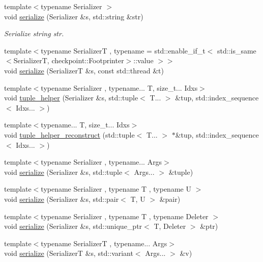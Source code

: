 \begin{DoxyCompactItemize}
{\footnotesize template$<$typename Serializer $>$ }\\void \hyperlink{namespacecheckpoint_aef8e8717e4cc129379525653730c4eba}{serialize} (Serializer \&s, std\+::string \&str)
\begin{DoxyCompactList}\small\item\em Serialize string {\ttfamily str}. \end{DoxyCompactList}\item 
{\footnotesize template$<$typename SerializerT , typename  = std\+::enable\+\_\+if\+\_\+t$<$    std\+::is\+\_\+same$<$\+Serializer\+T, checkpoint\+::\+Footprinter$>$\+::value  $>$$>$ }\\void \hyperlink{namespacecheckpoint_ab9c05efe18a47d990fb20e84f73e9943}{serialize} (SerializerT \&s, const std\+::thread \&t)
\item 
{\footnotesize template$<$typename Serializer , typename... T, size\+\_\+t... Idxs$>$ }\\void \hyperlink{namespacecheckpoint_ab763d3ca9396ff9a1896f5da6c2b3c54}{tuple\+\_\+helper} (Serializer \&s, std\+::tuple$<$ T... $>$ \&tup, std\+::index\+\_\+sequence$<$ Idxs... $>$)
\item 
{\footnotesize template$<$typename... T, size\+\_\+t... Idxs$>$ }\\void \hyperlink{namespacecheckpoint_a8370a2284f01f2fada353a096ab95f4d}{tuple\+\_\+helper\+\_\+reconstruct} (std\+::tuple$<$ T... $>$ $\ast$\&tup, std\+::index\+\_\+sequence$<$ Idxs... $>$)
\item 
{\footnotesize template$<$typename Serializer , typename... Args$>$ }\\void \hyperlink{namespacecheckpoint_a7ac21fa6ad08fd64a47c789c32966019}{serialize} (Serializer \&s, std\+::tuple$<$ Args... $>$ \&tuple)
\item 
{\footnotesize template$<$typename Serializer , typename T , typename U $>$ }\\void \hyperlink{namespacecheckpoint_a7b5c3ff67d3f7b65cfb46da7617e87ad}{serialize} (Serializer \&s, std\+::pair$<$ T, U $>$ \&pair)
\item 
{\footnotesize template$<$typename Serializer , typename T , typename Deleter $>$ }\\void \hyperlink{namespacecheckpoint_a617341cb0473cbdce921a3a4d049f4fc}{serialize} (Serializer \&s, std\+::unique\+\_\+ptr$<$ T, Deleter $>$ \&ptr)
\item 
{\footnotesize template$<$typename SerializerT , typename... Args$>$ }\\void \hyperlink{namespacecheckpoint_a8814df20276406605912524fad29c49b}{serialize} (SerializerT \&s, std\+::variant$<$ Args... $>$ \&v)

\end{DoxyCompactItemize}
